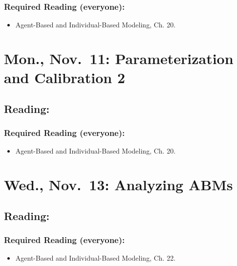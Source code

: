\documentclass[
]{article}
\providecommand{\tightlist}{%
  \setlength{\itemsep}{0pt}\setlength{\parskip}{0pt}}
\begin{document}
\subsubsection{Required Reading
(everyone):}\label{required-reading-everyone-18}

\begin{itemize}
\tightlist
\item
  Agent-Based and Individual-Based Modeling, Ch. 20.
\end{itemize}

\section{Mon., Nov.~11: Parameterization and Calibration
2}\label{mon.-nov.-11-parameterization-and-calibration-2}

\subsection{Reading:}\label{reading-22}

\subsubsection{Required Reading
(everyone):}\label{required-reading-everyone-19}

\begin{itemize}
\tightlist
\item
  Agent-Based and Individual-Based Modeling, Ch. 20.
\end{itemize}

\section{Wed., Nov.~13: Analyzing
ABMs}\label{wed.-nov.-13-analyzing-abms}

\subsection{Reading:}\label{reading-23}

\subsubsection{Required Reading
(everyone):}\label{required-reading-everyone-20}

\begin{itemize}
\tightlist
\item
  Agent-Based and Individual-Based Modeling, Ch. 22.
\end{itemize}
\end{document}
